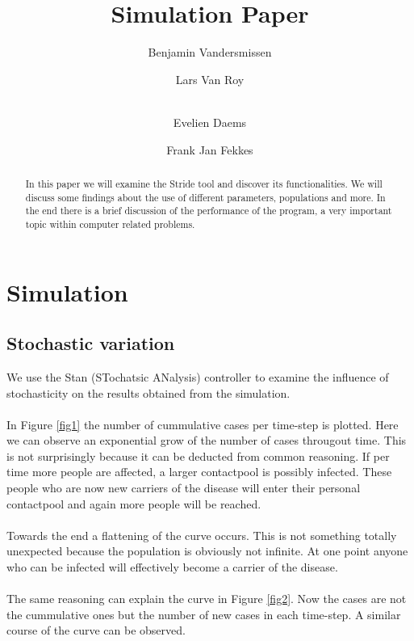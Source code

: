 \documentclass[runningheads]{llncs}
\begin{document}
	\title{Simulation Paper}
	
	\author{Benjamin Vandersmissen \and
		Lars Van Roy \and \\
		Evelien Daems \and
		Frank Jan Fekkes}
	\maketitle              %
	\begin{abstract}
		In this paper we will examine the Stride tool and discover its functionalities.
		We will discuss some findings about the use of different parameters, populations and more.
		In the end there is a brief discussion of the performance of the program, a very important topic within computer related problems.
		
	\end{abstract}
	
	\section{Simulation}
	
	\subsection{Stochastic variation}
	We use the Stan (STochatsic ANalysis) controller to examine the influence of stochasticity on the results obtained from the simulation. \\ \\
	In Figure \ref{fig1} the number of cummulative cases per time-step is plotted. Here we can observe an exponential grow of the number of cases througout time. This is not surprisingly because it can be deducted from common reasoning. If per time more people are affected, a larger contactpool is possibly infected. These people who are now new carriers of the disease will enter their personal contactpool and again more people will be reached.\\ \\
	Towards the end a flattening of the curve occurs. This is not something totally unexpected because the population is obviously not infinite. At one point anyone who can be infected will effectively become a carrier of the disease.\\ \\
	The same reasoning can explain the curve in Figure \ref{fig2}. Now the cases are not the cummulative ones but the number of new cases in each time-step. A similar course of the curve can be observed.
	
\end{document}
